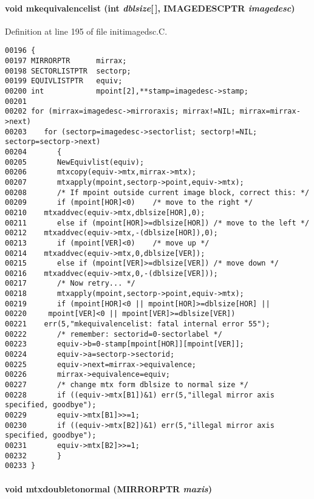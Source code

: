 \paragraph{\setlength{\rightskip}{0pt plus 5cm}void mkequivalencelist (int {\em dblsize}[$\,$], {\bf IMAGEDESCPTR} {\em imagedesc})}\hfill



Definition at line 195 of file initimagedsc.C.\small\begin{verbatim}00196 {
00197 MIRRORPTR      mirrax;
00198 SECTORLISTPTR  sectorp;
00199 EQUIVLISTPTR   equiv;
00200 int            mpoint[2],**stamp=imagedesc->stamp;
00201 
00202 for (mirrax=imagedesc->mirroraxis; mirrax!=NIL; mirrax=mirrax->next)
00203    for (sectorp=imagedesc->sectorlist; sectorp!=NIL; sectorp=sectorp->next)
00204       {
00205       NewEquivlist(equiv);
00206       mtxcopy(equiv->mtx,mirrax->mtx);
00207       mtxapply(mpoint,sectorp->point,equiv->mtx);
00208       /* If mpoint outside current image block, correct this: */
00209       if (mpoint[HOR]<0)    /* move to the right */
00210    mtxaddvec(equiv->mtx,dblsize[HOR],0);
00211       else if (mpoint[HOR]>=dblsize[HOR]) /* move to the left */
00212    mtxaddvec(equiv->mtx,-(dblsize[HOR]),0);
00213       if (mpoint[VER]<0)    /* move up */
00214    mtxaddvec(equiv->mtx,0,dblsize[VER]);
00215       else if (mpoint[VER]>=dblsize[VER]) /* move down */
00216    mtxaddvec(equiv->mtx,0,-(dblsize[VER]));
00217       /* Now retry... */
00218       mtxapply(mpoint,sectorp->point,equiv->mtx);
00219       if (mpoint[HOR]<0 || mpoint[HOR]>=dblsize[HOR] ||
00220     mpoint[VER]<0 || mpoint[VER]>=dblsize[VER])
00221    err(5,"mkequivalencelist: fatal internal error 55");
00222       /* remember: sectorid=0-sectorlabel */
00223       equiv->b=0-stamp[mpoint[HOR]][mpoint[VER]];
00224       equiv->a=sectorp->sectorid;
00225       equiv->next=mirrax->equivalence;
00226       mirrax->equivalence=equiv;
00227       /* change mtx form dblsize to normal size */
00228       if ((equiv->mtx[B1])&1) err(5,"illegal mirror axis specified, goodbye");
00229       equiv->mtx[B1]>>=1;
00230       if ((equiv->mtx[B2])&1) err(5,"illegal mirror axis specified, goodbye");
00231       equiv->mtx[B2]>>=1;
00232       }
00233 }
\end{verbatim}\normalsize 
\label{initimagedsc.C_a7}
\paragraph{\setlength{\rightskip}{0pt plus 5cm}void mtxdoubletonormal ({\bf MIRRORPTR} {\em maxis})}\hfill



